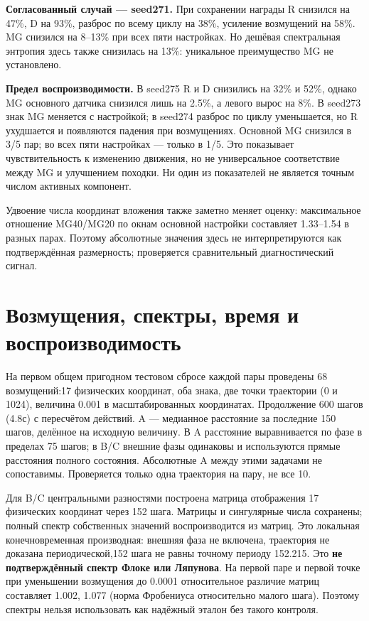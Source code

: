 \documentclass[10pt,a4paper]{article}
\begin{document}
\textbf{Согласованный случай --- seed271.} При сохранении награды R снизился на 47\%, D на 93\%, разброс по всему циклу на 38\%, усиление возмущений на 58\%. MG снизился на 8--13\% при всех пяти настройках. Но дешёвая спектральная энтропия здесь также снизилась на 13\%: уникальное преимущество MG не установлено.

\textbf{Предел воспроизводимости.} В seed275 R и D снизились на 32\% и 52\%, однако MG основного датчика снизился лишь на 2.5\%, а левого вырос на 8\%. В seed273 знак MG меняется с настройкой; в seed274 разброс по циклу уменьшается, но R ухудшается и появляются падения при возмущениях. Основной MG снизился в 3/5 пар; во всех пяти настройках --- только в 1/5. Это показывает чувствительность к изменению движения, но не универсальное соответствие между MG и улучшением походки. Ни один из показателей не является точным числом активных компонент.

Удвоение числа координат вложения также заметно меняет оценку: максимальное отношение MG40/MG20 по окнам основной настройки составляет 1.33--1.54 в разных парах. Поэтому абсолютные значения здесь не интерпретируются как подтверждённая размерность; проверяется сравнительный диагностический сигнал.

\newpage
\section*{Возмущения, спектры, время и воспроизводимость}

На первом общем пригодном тестовом сбросе каждой пары проведены 68 возмущений:17 физических координат, оба знака, две точки траектории (0 и 1024), величина 0.001 в масштабированных координатах. Продолжение 600 шагов (4.8с) с пересчётом действий. A --- медианное расстояние за последние 150 шагов, делённое на исходную величину. В A расстояние выравнивается по фазе в пределах 75 шагов; в B/C внешние фазы одинаковы и используются прямые расстояния полного состояния. Абсолютные A между этими задачами не сопоставимы. Проверяется только одна траектория на пару, не все 10.

Для B/C центральными разностями построена матрица отображения 17 физических координат через 152 шага. Матрицы и сингулярные числа сохранены; полный спектр собственных значений воспроизводится из матриц. Это локальная конечновременная производная: внешняя фаза не включена, траектория не доказана периодической,152 шага не равны точному периоду 152.215. Это \textbf{не подтверждённый спектр Флоке или Ляпунова}. На первой паре и первой точке при уменьшении возмущения до 0.0001 относительное различие матриц составляет 1.002, 1.077 (норма Фробениуса относительно малого шага). Поэтому спектры нельзя использовать как надёжный эталон без такого контроля.
\end{document}
